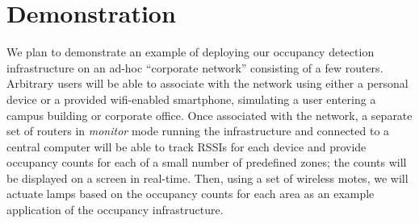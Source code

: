 \section{Demonstration}
We plan to demonstrate an example of deploying our occupancy detection infrastructure on an ad-hoc ``corporate network'' consisting of a few routers. Arbitrary users will be able to associate with the network using either a personal device or a provided wifi-enabled smartphone, simulating a user entering a campus building or corporate office. Once associated with the network, a separate set of routers in \emph{monitor} mode running the infrastructure and connected to a central computer will be able to track RSSIs for each device and provide occupancy counts for each of a small number of predefined zones; the counts will be displayed on a screen in real-time. Then, using a set of wireless motes, we will actuate lamps based on the occupancy counts for each area as an example application of the occupancy infrastructure.